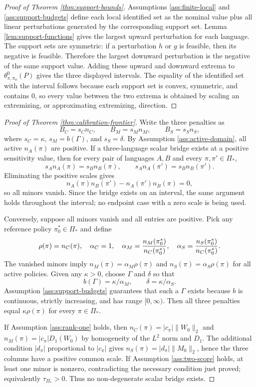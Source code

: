 \documentclass[11pt]{article}
\theoremstyle{definition}
\theoremstyle{plain}
\theoremstyle{remark}
\begin{document}
\begin{proof}[Proof of Theorem \ref{thm:support-bounds}]
Assumptions \ref{ass:finite-local} and \ref{ass:support-budgets} define each local
identified set as the nominal value plus all linear perturbations generated by the
corresponding support set.  Lemma \ref{lem:support-functions} gives the largest upward
perturbation for each language.  The support sets are symmetric: if a perturbation
$h$ or $g$ is feasible, then its negative is feasible.  Therefore the largest downward
perturbation is the negative of the same support value.  Adding these upward and
downward extrema to $\theta^0_{\pi,\pi_0}(P)$ gives the three displayed intervals.
The equality of the identified set with the interval follows because each support set
is convex, symmetric, and contains $0$, so every value between the two extrema is
obtained by scaling an extremizing, or approximating extremizing, direction.
\end{proof}

\begin{proof}[Proof of Theorem \ref{thm:calibration-frontier}]
Write the three penalties as
\[
  B_C=s_C n_C,\qquad B_M=s_M n_M,\qquad B_S=s_S n_S,
\]
where $s_C=\kappa$, $s_M=b(\Gamma)$, and $s_S=\delta$.  By Assumption
\ref{ass:active-domain}, all active $n_A(\pi)$ are positive.  If a three-language
scalar bridge exists at a positive sensitivity value, then for every pair of languages
$A,B$ and every $\pi,\pi'\in\Pi_\ast$,
\[
  s_A n_A(\pi)=s_B n_B(\pi),
  \qquad
  s_A n_A(\pi')=s_B n_B(\pi').
\]
Eliminating the positive scales gives
\[
  n_A(\pi)n_B(\pi')-n_A(\pi')n_B(\pi)=0,
\]
so all minors vanish.  Since the bridge exists on an interval, the same argument holds
throughout the interval; no endpoint case with a zero scale is being used.

Conversely, suppose all minors vanish and all entries are positive.  Pick any reference
policy $\pi_0^\ast\in\Pi_\ast$ and define
\[
  \rho(\pi)=n_C(\pi),\quad
  \alpha_C=1,\quad
  \alpha_M={n_M(\pi_0^\ast)\over n_C(\pi_0^\ast)},\quad
  \alpha_S={n_S(\pi_0^\ast)\over n_C(\pi_0^\ast)}.
\]
The vanished minors imply $n_M(\pi)=\alpha_M\rho(\pi)$ and
$n_S(\pi)=\alpha_S\rho(\pi)$ for all active policies.  Given any $\kappa>0$, choose
$\Gamma$ and $\delta$ so that
\[
  b(\Gamma)=\kappa/\alpha_M,\qquad
  \delta=\kappa/\alpha_S.
\]
Assumption \ref{ass:support-budgets} guarantees that such a $\Gamma$ exists because
$b$ is continuous, strictly increasing, and has range $[0,\infty)$.  Then all three
penalties equal $\kappa\rho(\pi)$ for every $\pi\in\Pi_\ast$.

If Assumption \ref{ass:rank-one} holds, then
$n_C(\pi)=|c_\pi|\|W_0\|_2$ and
$n_M(\pi)=|c_\pi|D_1(W_0)$ by homogeneity of the $L^2$ norm and $D_1$.  The additional
condition $|d_\pi|$ proportional to $|c_\pi|$ gives
$n_S(\pi)=|d_\pi|\|M_0\|_2$, hence the three columns have a positive common scale.
If Assumption \ref{ass:two-score} holds, at least one minor is nonzero, contradicting
the necessary condition just proved; equivalently $\tau_{\Pi_\ast}>0$.  Thus no
non-degenerate scalar bridge exists.
\end{proof}
\end{document}

